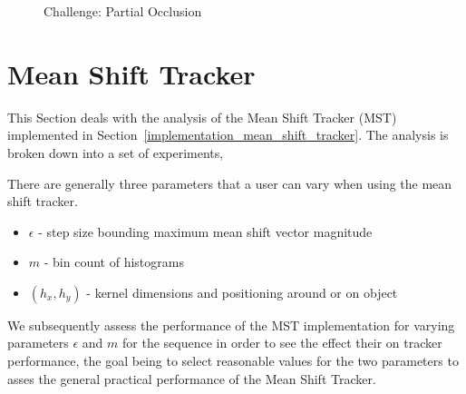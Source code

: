 \begin{figure}     
    \caption{Challenge: Partial Occlusion\label{fig:ch_partial_occlusion}
    }
\end{figure}


\section{Mean Shift Tracker}
This Section deals with the analysis of the Mean Shift Tracker (MST)
implemented in Section~\ref{implementation_mean_shift_tracker}. The analysis is
broken down into a set of experiments,

There are generally three parameters that a user can vary when using the mean
shift tracker. 
\begin{itemize}
    \item $\epsilon$ - step size bounding maximum mean shift vector magnitude
    \item $m$ - bin count of histograms
    \item $(h_x,h_y)$ - kernel dimensions and positioning around or on object
\end{itemize}
We subsequently assess the performance of the MST implementation
for varying parameters $\epsilon$ and $m$ for the sequence in order to see the
effect their on tracker performance, the goal being to select reasonable values
for the two parameters to asses the general practical performance of the Mean
Shift Tracker. 

